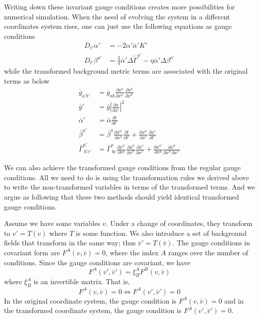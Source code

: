 \documentclass[letterpaper,nofootinbib,prd,amsmath,onecolumn]{revtex4-1}
\begin{document}
Writing down these invariant gauge conditions creates more possibilities for numerical simulation. When the need of evolving the system in a different coordinates system rises, one can just use the following equations as gauge conditions
\begin{align*}
D_{t'}\alpha' & = -2\alpha'{\bar \alpha}'K'\\
D_{t'}\beta^{a'} & = \frac{3}{4}{\bar \alpha}'\Delta {\tilde \Gamma}^{a'} - \eta {\bar \alpha}'\Delta\beta^{a'}
\end{align*}
while the transformed background metric terms are associated with the original terms as below
\begin{align}
{\bar g}_{a'b'} & = {\bar g}_{ab}\frac{\partial x^{a}}{\partial x^{a'}}\frac{\partial x^{b}}{\partial x^{b'}}\\
{\bar g'} & = {\bar g}|\frac{\partial x}{\partial x'}|^{2}\\
{\bar \alpha}' & = {\bar \alpha}\frac{\partial t}{\partial t'}\\
{\bar \beta}^{a'} & = {\bar \beta}^{a}\frac{\partial x^{a'}}{\partial x^{a}}\frac{\partial t}{\partial t'} + \frac{\partial x^{a'}}{\partial x^{c}}\frac{\partial x^{c}}{\partial t'}\label{background shift}\\
{\bar \Gamma}^{a'}_{~b'c'} & = {\bar \Gamma}^{a}_{~bc}\frac{\partial x^{a'}}{\partial x^{a}}\frac{\partial x^{b}}{\partial x^{b'}}\frac{\partial x^{c}}{\partial x^{c'}} + \frac{\partial x^{a'}}{\partial x^{d}}\frac{\partial x^{d}}{\partial x^{b'}\partial x^{c'}}
\end{align}

We can also achieve the transformed gauge conditions from the regular gauge conditions. All we need to do is using the transformation rules we derived above to write the non-transformed variables in terms of the transformed terms. And we argue as following that these two methods should yield identical transformed gauge conditions. 

Assume we have some variables $v$. Under a change of coordinates, they transform to $v' = T(v)$ where $T$ is some function. We also introduce a 
set of background fields that transform in the same way; thus $\bar v' = T(\bar v)$. The gauge conditions in covariant form are $F^A(v,\bar v) = 0$, 
where the index $A$ ranges over the number of conditions. Since the gauge conditions are covariant, we have 
\begin{equation}
	F^A(v',\bar v') = \xi^A_B F^B(v,\bar v)
\end{equation}
where $\xi^A_B$ is an invertible matrix. That is, 
\begin{equation}\label{invariant equivalence}
	 F^A(v,\bar v) = 0 \Longleftrightarrow F^A(v',\bar v') = 0
\end{equation}
In the original coordinate system, the gauge condition is $F^A(v,\bar v) = 0$ and in the transformed coordinate system, the 
gauge condition is $F^A(v',\bar v') = 0$.
\end{document}
